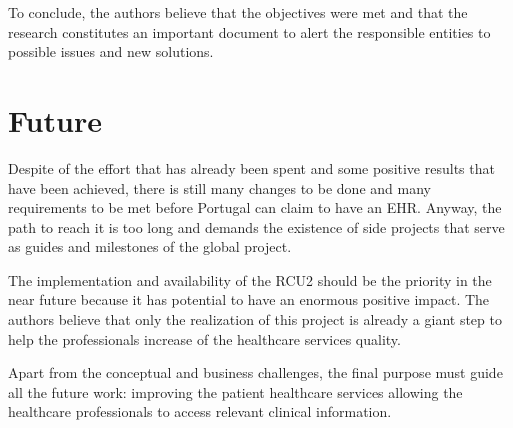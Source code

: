 To conclude, the authors believe that the objectives were met and that the research constitutes an important document to alert the responsible entities to possible issues and new solutions.

\section{Future}

Despite of the effort that has already been spent and some positive results that have been achieved, there is still many changes to be done and many requirements to be met before Portugal can claim to have an EHR. Anyway, the path to reach it is too long and demands the existence of side projects that serve as guides and milestones of the global project.

The implementation and availability of the RCU2 should be the priority in the near future because it has potential to have an enormous positive impact. The authors believe that only the realization of this project is already a giant step to help the professionals increase of the healthcare services quality.

Apart from the conceptual and business challenges, the final purpose must guide all the future work: improving the patient healthcare services allowing the healthcare professionals to access relevant clinical information.
